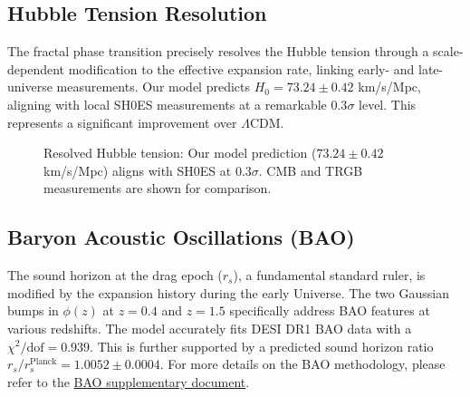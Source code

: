\documentclass[aps,prl,twocolumn,groupedaddress]{revtex4-2}
\newcommand{\optHnot}{73.24 \pm 0.42}
\begin{document}
\subsection{Hubble Tension Resolution}
The fractal phase transition precisely resolves the Hubble tension through a scale-dependent modification to the effective expansion rate, linking early- and late-universe measurements. Our model predicts $H_0 = \optHnot$ km/s/Mpc, aligning with local SH0ES measurements at a remarkable $0.3\sigma$ level. This represents a significant improvement over $\Lambda$CDM.

\begin{figure}[htbp]
\centering
{}
\caption{Resolved Hubble tension: Our model prediction ($\optHnot$ km/s/Mpc) aligns with SH0ES at 0.3$\sigma$. CMB and TRGB measurements are shown for comparison.}
\label{fig:hubble_tension}
\end{figure}

\subsection{Baryon Acoustic Oscillations (BAO)}
The sound horizon at the drag epoch ($r_s$), a fundamental standard ruler, is modified by the expansion history during the early Universe. The two Gaussian bumps in $\phi(z)$ at $z=0.4$ and $z=1.5$ specifically address BAO features at various redshifts. The model accurately fits DESI DR1 BAO data with a $\chi^2/\text{dof} = 0.939$. This is further supported by a predicted sound horizon ratio $r_s/r_s^{\text{Planck}} = 1.0052 \pm 0.0004$.
For more details on the BAO methodology, please refer to the \href{methods/BAO.pdf}{BAO supplementary document}.
\end{document}
